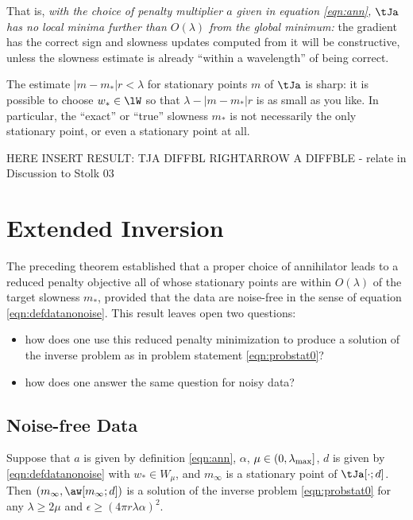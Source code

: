  That is, {\em with the choice of penalty
  multiplier $a$ given in equation \ref{eqn:ann}, $\tJa$ has no local minima
  further than  $O(\lambda)$ from the global minimum:} the gradient
has the correct sign and slowness updates computed from it will be
constructive, unless the slowness estimate is already ``within a
wavelength'' of being correct.

 The estimate $|m-m_*|r<\lambda$ for stationary
points $m$ of $\tJa$ is sharp: it is possible to choose $w_* \in \lW$
so that $\lambda - |m-m_*|r$ is as small as you like. In particular,
the ``exact'' or ``true'' slowness $m_*$ is not necessarily the only 
stationary point, or even a stationary point at all.

HERE INSERT RESULT: TJA DIFFBL RIGHTARROW A DIFFBLE - relate in
Discussion to Stolk 03

\section{Extended Inversion}
The preceding theorem established that a proper choice of annihilator
leads to a reduced penalty objective all of whose stationary points
are within $O(\lambda)$ of the target slowness $m_*$, provided that
the data are noise-free in the sense of equation
\ref{eqn:defdatanonoise}. This result leaves open two questions:
\begin{itemize}
\item how does one use this reduced penalty minimization to produce
  a solution of the inverse problem as in problem statement
  \ref{eqn:probstat0}? 
\item how does one answer the same question for noisy data?
\end{itemize}

\subsection{Noise-free Data}
\begin{theorem}
  \label{thm:ipnonoisesuf}
  Suppose that $a$ is given by definition \ref{eqn:ann}, $\alpha$,
  $\mu \in (0,\lambda_{\rm max}]$,
  $d$ is given by
  \ref{eqn:defdatanonoise} with $w_* \in W_{\mu}$, and  $m_{\infty}$ is a stationary
  point of $\tJa[\cdot;d]$. Then $(m_{\infty},\aw[m_{\infty};d])$ is a
  solution of the inverse problem \ref{eqn:probstat0} for any $\lambda
  \ge 2\mu$ and $\epsilon \ge (4\pi r \lambda \alpha)^2$.
\end{theorem}

